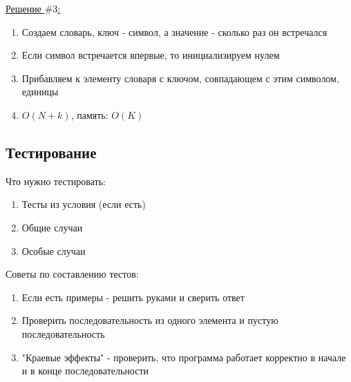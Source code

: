 \documentclass[a4paper, 12pt]{article}
\begin{document}
\underline{Решение $\#3$:}

\begin{enumerate}
    \item Создаем словарь, ключ - символ, а значение
    - сколько раз он встречался
    \item Если символ встречается впервые, то инициализируем нулем
    \item Прибавляем к элементу словаря с ключом, совпадающем
    с этим символом, единицы
    \item $O(N + k)$, память: $O(K)$
\end{enumerate}

\subsection{Тестирование}

Что нужно тестировать:

\begin{enumerate}
    \item Тесты из условия (если есть)
    \item Общие случаи
    \item Особые случаи
\end{enumerate}

Советы по составлению тестов:

\begin{enumerate}
    \item Если есть примеры - решить руками и сверить ответ
    \item Проверить последовательность из одного элемента
    и пустую последовательность
    \item "Краевые эффекты" - проверить, что программа работает
    корректно в начале и в конце последовательности
\end{enumerate}
\end{document}
